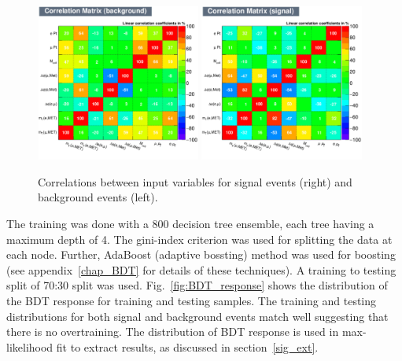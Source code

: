 \begin{figure}[htpb]
\begin{center}
\includegraphics[width=0.48\textwidth]{plots_and_figures/chapter5/CorrelationMatrixB.pdf}
\includegraphics[width=0.48\textwidth]{plots_and_figures/chapter5/CorrelationMatrixS.pdf}\\
\end{center}
\caption{ Correlations between input variables for signal events (right) and background events (left).}
\label{fig:bdt_corr_mat}
\end{figure}

The training was done with a 800 decision tree ensemble, each tree having a maximum depth of 4. The gini-index criterion was used for splitting the data at each node. Further, AdaBoost (adaptive bossting) method was used for boosting (see appendix~\ref{chap_BDT} for details of these techniques). A training to testing split of 70:30 split was used. Fig.~\ref{fig:BDT_response} shows the distribution of the BDT response for training and testing samples. The training and testing distributions for both signal and background events match well suggesting that there is no overtraining. The distribution of BDT response is used in max-likelihood fit to extract results, as discussed in section~\ref{sig_ext}.  

